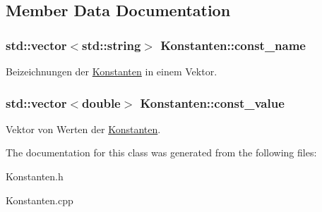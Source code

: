 \subsection{Member Data Documentation}
\hypertarget{classKonstanten_abd044489471f59656078d51706353bf5}{
\subsubsection[{const\-\_\-name}]{\setlength{\rightskip}{0pt plus 5cm}std\-::vector$<$std\-::string$>$ Konstanten\-::const\-\_\-name}}\label{classKonstanten_abd044489471f59656078d51706353bf5}
Beizeichnungen der \hyperlink{classKonstanten}{Konstanten} in einem Vektor. \hypertarget{classKonstanten_a12dc216c8d055e95ed17d819a5949832}{
\subsubsection[{const\-\_\-value}]{\setlength{\rightskip}{0pt plus 5cm}std\-::vector$<$double$>$ Konstanten\-::const\-\_\-value}}\label{classKonstanten_a12dc216c8d055e95ed17d819a5949832}
Vektor von Werten der \hyperlink{classKonstanten}{Konstanten}. 

The documentation for this class was generated from the following files\-:\begin{DoxyCompactItemize}
\item 
Konstanten.\-h\item 
Konstanten.\-cpp\end{DoxyCompactItemize}
